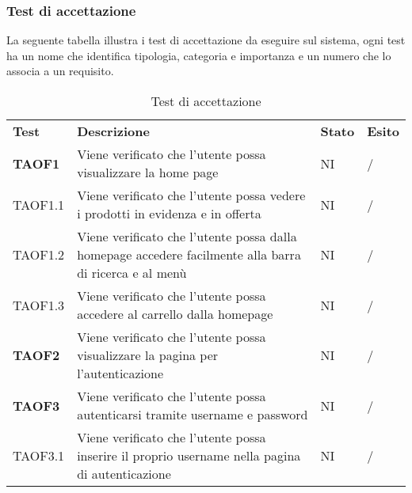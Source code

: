 \subsubsection{Test di accettazione}
La seguente tabella illustra i test di accettazione da eseguire sul sistema, ogni test ha un nome che identifica tipologia, categoria e importanza e un numero che lo associa a un requisito.
\begin{center}
    \centering
    \renewcommand{\arraystretch}{1.8}
    \label{tab:TestAccettazione}
    \begin{longtable}[!h]{p{60px} p{240px} p{35px} p{35px}}
        \caption{Test di accettazione}                                                                                                                                           \\
        \rowcolor{logo!70}
        \textbf{Test}   & \textbf{Descrizione}                                                                                                 & \textbf{Stato} & \textbf{Esito} \\
        \textbf{TAOF1}  & Viene verificato che l'utente possa visualizzare la home page                                                        & NI             & /              \\
        TAOF1.1         & Viene verificato che l'utente possa vedere i prodotti in evidenza e in offerta                                       & NI             & /              \\
        TAOF1.2         & Viene verificato che l'utente possa dalla homepage accedere facilmente alla barra di ricerca e al menù               & NI             & /              \\
        TAOF1.3         & Viene verificato che l'utente possa accedere al carrello dalla homepage                                              & NI             & /              \\
        \textbf{TAOF2}  & Viene verificato che l'utente possa visualizzare la pagina per l'autenticazione                                      & NI             & /              \\
        \textbf{TAOF3}  & Viene verificato che l'utente possa autenticarsi tramite username e password                                         & NI             & /              \\
        TAOF3.1         & Viene verificato che l'utente possa inserire il proprio username nella pagina di autenticazione                      & NI             & /              \\

\end{longtable}
\end{center}
